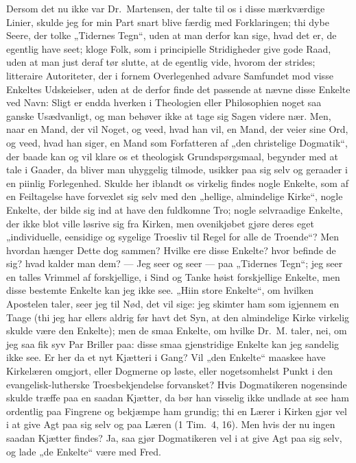 Dersom det nu ikke var Dr.\ Martensen, der talte til os i disse
mærkværdige Linier, skulde jeg for min Part snart blive færdig med
Forklaringen; thi dybe Seere, der tolke „Tidernes Tegn“, uden at
man derfor kan sige, hvad det er, de egentlig have seet; kloge
Folk, som i principielle Stridigheder give gode Raad, uden at man
just deraf tør slutte, at de egentlig vide, hvorom der strides;
litteraire Autoriteter, der i fornem Overlegenhed advare Samfundet
mod visse Enkeltes Udskeielser, uden at de derfor finde det
passende at nævne disse Enkelte ved Navn: Sligt er endda hverken i
Theologien eller Philosophien noget saa ganske Usædvanligt, og man
 behøver ikke at tage sig Sagen videre nær. Men, naar en Mand, der
vil Noget, og veed, hvad han vil, en Mand, der veier sine Ord, og
veed, hvad han siger, en Mand som Forfatteren af „den christelige
Dogmatik“, der baade kan og vil klare os et theologisk
Grundspørgsmaal, begynder med at tale i Gaader, da bliver man
uhyggelig tilmode, usikker paa sig selv og geraader i en piinlig
Forlegenhed. Skulde her iblandt os virkelig findes nogle Enkelte,
som af en Feiltagelse have forvexlet sig selv med den „hellige,
almindelige Kirke“, nogle Enkelte, der bilde sig ind at have den
fuldkomne Tro; nogle selvraadige Enkelte, der ikke blot ville
løsrive sig fra Kirken, men ovenikjøbet gjøre deres eget
„individuelle, eensidige og sygelige Troesliv til Regel for alle
de Troende“? Men hvordan hænger Dette dog sammen? Hvilke ere disse
Enkelte? hvor befinde de sig? hvad kalder man dem? --- Jeg seer og
seer --- paa „Tidernes Tegn“; jeg seer en talles Vrimmel af
forskjellige, i Sind og Tanke høist forskjellige Enkelte, men
disse bestemte Enkelte kan jeg ikke see. „Hiin store Enkelte“, om
hvilken Apostelen taler, seer jeg til Nød, det vil sige: jeg
skimter ham som igjennem en Taage (thi jeg har ellers aldrig før
havt det Syn, at den almindelige Kirke virkelig skulde være den
Enkelte); men de smaa Enkelte, om hvilke Dr.\ M. taler, nei, om
jeg saa fik syv Par Briller paa: disse smaa gjenstridige Enkelte
kan jeg sandelig ikke see. Er her da et nyt Kjætteri i Gang? Vil
„den Enkelte“ maaskee have Kirkelæren omgjort, eller Dogmerne op%
løste, eller nogetsomhelst Punkt i den evangelisk-lutherske
Troesbekjendelse forvansket? Hvis Dogmatikeren nogensinde skulde
træffe paa en saadan Kjætter, da bør han visselig ikke undlade at
see ham ordentlig paa Fingrene og bekjæmpe ham grundig; thi en
Lærer i Kirken gjør vel i at give Agt paa sig selv og paa Læren
(1 Tim.\ 4, 16). Men hvis der nu ingen saadan Kjætter findes? Ja,
saa gjør Dogmatikeren vel i at give Agt paa sig selv, og lade „de
Enkelte“ være med Fred.

